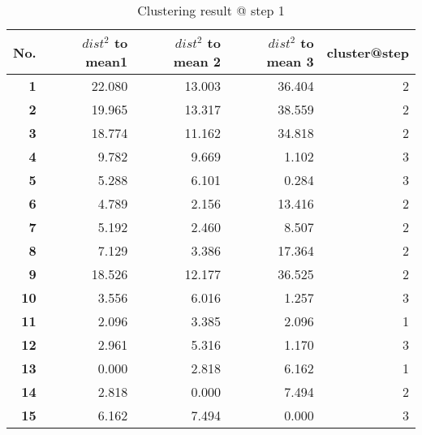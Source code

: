 \begin{table}[htbp]
  \centering
  \caption{Clustering result @ step 1}
    \begin{tabular}{rrrrr}
    \toprule
    \textbf{No.} & \textbf{$dist^2$ to mean1} & \textbf{$dist^2$ to mean 2} & \textbf{$dist^2$ to mean 3} & \textbf{cluster@step} \\
    \midrule
    \textbf{1} & 22.080  & 13.003  & 36.404  & 2 \\
    \textbf{2} & 19.965  & 13.317  & 38.559  & 2 \\
    \textbf{3} & 18.774  & 11.162  & 34.818  & 2 \\
    \textbf{4} & 9.782  & 9.669  & 1.102  & 3 \\
    \textbf{5} & 5.288  & 6.101  & 0.284  & 3 \\
    \textbf{6} & 4.789  & 2.156  & 13.416  & 2 \\
    \textbf{7} & 5.192  & 2.460  & 8.507  & 2 \\
    \textbf{8} & 7.129  & 3.386  & 17.364  & 2 \\
    \textbf{9} & 18.526  & 12.177  & 36.525  & 2 \\
    \textbf{10} & 3.556  & 6.016  & 1.257  & 3 \\
    \textbf{11} & 2.096  & 3.385  & 2.096  & 1 \\
    \textbf{12} & 2.961  & 5.316  & 1.170  & 3 \\
    \textbf{13} & 0.000  & 2.818  & 6.162  & 1 \\
    \textbf{14} & 2.818  & 0.000  & 7.494  & 2 \\
    \textbf{15} & 6.162  & 7.494  & 0.000  & 3 \\
    \bottomrule
    \end{tabular}%
  \label{tab:cluster_b1}%
\end{table}%
